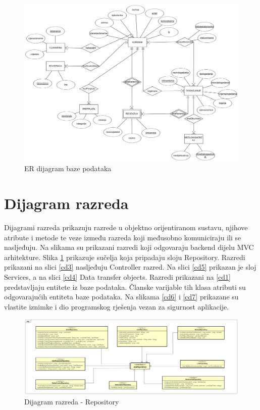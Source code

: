 				\newpage
				
				\begin{figure}[H]
					\includegraphics[width=\textwidth]{dijagrami/db_ER.png} 
					\centering
					\caption{ER dijagram baze podataka}
				\end{figure}
				
			\eject
			
			
		\section{Dijagram razreda}
		
		Dijagrami razreda prikazuju razrede u objektno orijentiranom sustavu, njihove atribute i
		metode te veze između razreda koji međusobno komuniciraju ili se nasljeđuju. Na slikama su prikazani razredi koji odgovaraju backend dijelu MVC arhitekture. Slika \ref{cd2} prikazuje sučelja koja pripadaju sloju Repository. Razredi prikazani na slici \ref{cd3} nasljeđuju Controller razred. Na slici \ref{cd5} prikazan je sloj Services, a na slici \ref{cd4} Data transfer objects. Razredi prikazani na \ref{cd1} predstavljaju entitete iz baze podataka. Članske varijable tih klasa atributi su odgovarajućih entiteta baze podataka. Na slikama \ref{cd6} i \ref{cd7} prikazane su vlastite iznimke i dio programskog rješenja vezan za sigurnost aplikacije.  
		
		\vspace{-0.4cm}

			\begin{figure}[H]
				\includegraphics[width=\textwidth]{dijagrami/cd2.png} 
				\centering
				\vspace{-0.5cm}
				\caption{Dijagram razreda - Repository}
				\label{cd2}
			\end{figure}
			
